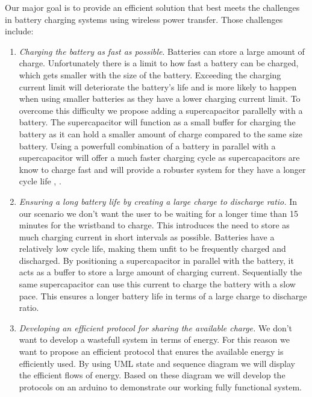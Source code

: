 %
%
Our major goal is to provide an efficient solution that best meets the challenges in battery charging systems using wireless power transfer.
Those challenges include:
\begin{enumerate}
\item \emph{Charging the battery as fast as possible}.
Batteries can store a large amount of charge. Unfortunately there is a limit to how fast a battery can be charged, which gets smaller with the size of the battery. Exceeding the charging current limit will deteriorate the battery's life and is more likely to happen when using smaller batteries as they have a lower charging current limit. To overcome this difficulty we propose adding a supercapacitor parallelly with a battery. The supercapacitor will function as a small buffer for charging the battery as it can hold a smaller amount of charge compared to the same size battery. Using a powerfull combination of a battery in parallel with a supercapacitor will offer a much faster charging cycle as supercapacitors are know to charge fast and will provide a robuster system for they have a longer cycle life \cite{superbattery}, \cite{IAmp}.

\item \emph{Ensuring a long battery life by creating a large charge to discharge ratio.}
In our scenario we don't want the user to be waiting for a longer time than 15 minutes for the wristband to charge. This introduces the need to store as much charging current in short intervals as possible. Batteries have a relatively low cycle life, making them unfit to be frequently charged and discharged. By positioning a supercapacitor in parallel with the battery, it acts as a buffer to store a large amount of charging current. Sequentially the same supercapacitor can use this current to charge the battery with a slow pace. This ensures a longer battery life in terms of a large charge to discharge ratio. 

\item \emph{Developing an efficient protocol for sharing the available charge.}
We don't want to develop a wastefull system in terms of energy. For this reason we want to propose an efficient protocol that enures the available energy is efficiently used. By using UML state and sequence diagram we will display the efficient flows of energy. Based on these diagram we will develop the protocols on an arduino to demonstrate our working fully functional system.
\end{enumerate}

